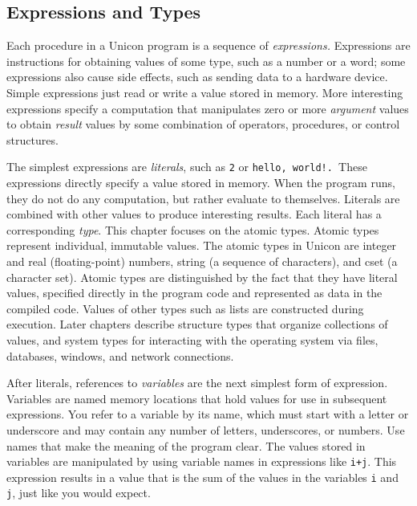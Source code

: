 \subsection{Expressions and Types}

Each procedure in a Unicon program is a sequence of
\textit{expression}\textit{s.} Expressions are
instructions for obtaining values of some
type, such as a number or a word; some expressions also
cause side effects, such as sending data to a hardware device.
Simple expressions just read or write a value stored in
memory. More interesting expressions specify a computation that
manipulates zero or more \textit{argument} values to
obtain \textit{result} values by some combination of
operators, procedures, or control structures.

The simplest expressions are \textit{literal}\textit{s},
such as \texttt{2} or \texttt{{\textquotedbl}hello,
world!{\textquotedbl}}\texttt{. }These expressions directly specify a
value stored in memory. When the program runs, they do not do any
computation, but rather evaluate to themselves. Literals are combined
with other values to produce interesting results. Each literal has a
corresponding \textit{type}. This chapter focuses on the atomic types. Atomic types represent individual, immutable values. The atomic types in Unicon are
integer and real (floating-point)
numbers, string (a sequence of characters), and
cset (a character set). Atomic types
are distinguished by the fact that they have literal values, specified
directly in the program code and represented as data in the compiled
code. Values of other types such as lists are constructed during
execution. Later chapters describe structure types that organize
collections of values, and system types for interacting with the
operating system via files, databases, windows, and network
connections. 

After literals, references to
\textit{variable}\textit{s} are the next simplest form
of expression. Variables are named memory locations that hold values
for use in subsequent expressions. You refer to a variable by its name,
which must start with a letter or underscore and may contain any number
of letters, underscores, or numbers. Use names that make the meaning of
the program clear. The values stored in variables are manipulated by
using variable names in expressions like \texttt{i+j}. This expression
results in a value that is the sum of the values in the variables
\texttt{i} and \texttt{j}, just like you would expect.

